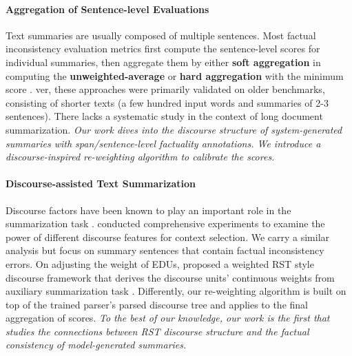 \paragraph{Aggregation of Sentence-level Evaluations}
Text summaries are usually composed of multiple sentences. Most factual inconsistency evaluation metrics first compute the sentence-level scores for individual summaries, then aggregate them by either \textbf{soft aggregation} in computing the 
\textbf{unweighted-average} \cite{ zha-etal-2023-alignscore, glover-etal-2022-revisiting,scire-etal-2024-fenice,zhang-etal-2024-fine} or  \textbf{hard aggregation} with the minimum score \cite{ schuster-etal-2022-stretching,yang2024fizz}. ver, these approaches were primarily validated on older benchmarks, consisting of shorter texts (a few hundred input words and summaries of 2-3 sentences). There lacks a systematic study in the context of long document summarization. \textit{Our work dives into the discourse structure of system-generated summaries with span/sentence-level factuality annotations. We introduce a discourse-inspired re-weighting algorithm to calibrate the scores.}
\vspace{-1mm}

\paragraph{Discourse-assisted Text Summarization} Discourse factors have been known to play an important role in the summarization task \cite{ono-etal-1994-abstract, Marcu1998tobuild, kikuchi-etal-2014-single, xu-etal-2020-discourse, hewett-stede-2022-extractive, pu-etal-2023-incorporating}. \citet{louis-etal-2010-discourse} conducted comprehensive experiments to examine the power of different discourse features for context selection. We carry a similar analysis but focus on summary sentences that contain factual inconsistency errors. On adjusting the weight of EDUs, \citet{huber-etal-2021-w} proposed a weighted RST style discourse framework that derives the discourse units' continuous weights from auxiliary summarization task \cite{xiao-etal-2021-predicting}. Differently, our re-weighting algorithm is built on top of the trained parser's parsed discourse tree and applies to the final aggregation of scores. \textit{To the best of our knowledge, our work is the first that studies the connections between RST discourse structure and the factual consistency of model-generated summaries.}
